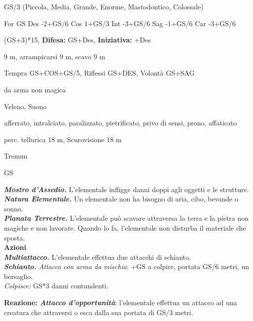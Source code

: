 \begin{multicols}{2}
{
\begin{description}[noitemsep, topsep=0pt, parsep=0pt, partopsep=0pt, itemsep=1pt, leftmargin=2.35cm,  labelwidth=2.2cm, itemindent=0cm, listparindent=0pt] %
\setlength{\baselineskip}{10pt}
\item[\textbf{Taglia/Tipo}] GS/3 (Piccola, Media, Grande, Enorme, Mastodontico, Colossale)
\item[\textbf{Caratt.}] For GS Des -2+GS/6 Cos 1+GS/3 Int -3+GS/6 Sag -1+GS/6 Car -3+GS/6
\item[\textbf{Punti Ferita}] (GS+3)*15, \textbf{Difesa:} GS+Des, \textbf{Iniziativa:} +Des
\item[\textbf{Movimento}] 9 m, arrampicarsi 9 m, scavo 9 m
\item[\textbf{Tiri Salvez.}] Tempra GS+COS+GS/5, Riflessi GS+DES, Volontà GS+SAG
\item[\textbf{Res. Danni}] da arma non magica
\item[\textbf{Imm. Danni}] Veleno, Suono
\item[\textbf{Immunità}] afferrato, intralciato, paralizzato, pietrificato, privo di sensi, prono, affaticato
\item[\textbf{Sensi}] perc. tellurica 18 m, Scurovisione 18 m
\item[\textbf{Linguaggi}] Tremun
\item[\textbf{Sfida}] GS \\
\end{description}

\emph{\textbf{Mostro d'Assedio.}} L'elementale infligge danni doppi agli oggetti e le strutture.\\
\emph{\textbf{Natura Elementale.}} Un elementale non ha bisogno di aria, cibo, bevande o sonno.\\
\emph{\textbf{Planata Terrestre.}} L'elementale può scavare attraversa la terra e la pietra non magiche e non lavorate. Quando lo fa, l'elementale non disturba il materiale che sposta.\\
\textbf{Azioni}\\
\emph{\textbf{Multiattacco.}} L'elementale effettua due attacchi di schianto.\\
\emph{\textbf{Schianto.} Attacco con arma da mischia}: +GS a colpire, portata GS/6 metri, un bersaglio.\\
\emph{Colpisce:} GS*3 danni contundenti.

\textbf{Reazione: \emph{Attacco d'opportunità}}: l'elementale effettua un attacco ad una creatura che attraversi o esca dalla sua portata di GS/3 metri.


}
\end{multicols}
